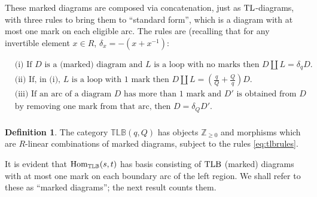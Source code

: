 \documentclass[12pt]{amsart}
\theoremstyle{definition}
\newtheorem{definition}[theorem]{Definition}
\theoremstyle{remark}
\numberwithin{equation}{section}
\newcommand{\Z}{{\mathbb Z}}
\newcommand{\be}{\begin{equation}}
\newcommand{\ee}{\end{equation}}
\newcommand{\inv}{^{-1}}
\newcommand{\Hom}{{\rm{Hom}}}
\newcommand{\TL}{{\rm{TL}}}
\newcommand{\TLB}{{\rm{TLB}}}
\newcommand{\TLBB}{{\mathbb{TLB}}}
\begin{document}
These marked diagrams are composed via concatenation, just as $\TL$-diagrams, with three rules to bring them 
to ``standard form'', which is a diagram with at most one mark on each eligible arc. The rules are (recalling that
for any invertible element $x\in R$, $\delta_x=-(x+x\inv)$:

\be\label{eq:tlbrules}
\begin{aligned}
&\text{(i) If $D$ is a (marked) diagram and $L$ is a loop with no marks then $D\amalg L=\delta_q D$.}\\
&\text{(ii) If, in (i), $L$ is a loop with 1 mark then $D\amalg L=\left(\frac{q}{Q}+\frac{Q}{q}\right) D$.}\\
&\text{(iii) If an arc of a diagram $D$ has more than $1$ mark and $D'$ is obtained from $D$}\\
&\text {by removing one mark from that arc, then $D=\delta_Q D'$.}\\
\end{aligned}
\ee



\begin{definition}\label{def:tlbb}
The category $\TLBB(q,Q)$ has objects $\Z_{\geq 0}$ and morphisms which are $R$-linear combinations of marked diagrams,
subject to the rules \eqref{eq:tlbrules}.
\end{definition}

It is evident that $\Hom_{\TLBB}(s,t)$ has basis consisting of $\TLB$ (marked) diagrams with at most one mark
on each boundary arc of the left region. We shall refer to these as ``marked diagrams''; the next result counts them. 
\end{document}
